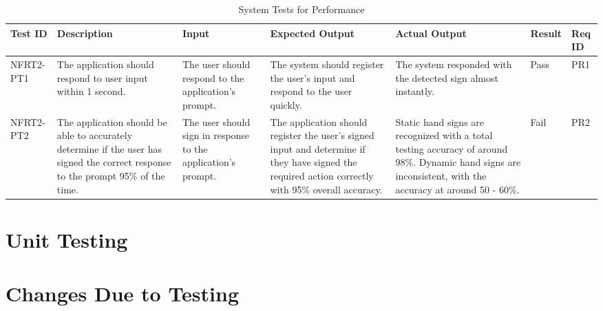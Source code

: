\documentclass[12pt, titlepage]{article}
\begin{document}
\begin{longtable}{|p{1.5cm}|p{2.5cm}|p{2cm}|p{2cm}|p{2cm}|p{1.5cm}|p{1cm}|}
\caption{System Tests for Performance} \\
\hline
\textbf{Test ID} & \textbf{Description} & \textbf{Input} & \textbf{Expected Output} & \textbf{Actual Output} & \textbf{Result} & \textbf{Req ID}\\
\hline
NFRT2-PT1 & The application should respond to user input within 1 second. & The user should respond to the application's prompt. & The system should register the user's input and respond to the user quickly. & The system responded with the detected sign almost instantly. & Pass & PR1 \\
\hline
NFRT2-PT2 & The application should be able to accurately determine if the user has signed the correct response to the prompt 95\% of the time. & The user should sign in response to the application's prompt. & The application should register the user's signed input and determine if they have signed the required action correctly with 95\% overall accuracy. & Static hand signs are recognized with a total testing accuracy of around 98\%. Dynamic hand signs are inconsistent, with the accuracy at around 50 - 60\%.  & Fail & PR2 \\
\bottomrule
\end{longtable}
	


\section{Unit Testing}

\section{Changes Due to Testing}
\end{document}
